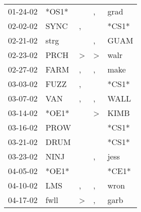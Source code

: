 \begin{supertabular}{p{0.07\textwidth}p{0.06\textwidth}p{0.02\textwidth}p{0.02\textwidth}p{0.06\textwidth}}
          01-24-02\textsuperscript{} &                            *OS1* &                  &                , &           grad\textsuperscript{} \\
          02-02-02\textsuperscript{} &           SYNC\textsuperscript{} &                , &                  &                            *CS1* \\
          02-21-02\textsuperscript{} &           strg\textsuperscript{} &                  &                , &           GUAM\textsuperscript{} \\
          02-23-02\textsuperscript{} &           PRCH\textsuperscript{} &     \textgreater &     \textgreater &           walr\textsuperscript{} \\
          02-27-02\textsuperscript{} &           FARM\textsuperscript{} &                , &                , &           make\textsuperscript{} \\
          03-03-02\textsuperscript{} &           FUZZ\textsuperscript{} &                , &                  &                            *CS1* \\
          03-07-02\textsuperscript{} &            VAN\textsuperscript{} &                , &                , &           WALL\textsuperscript{} \\
          03-14-02\textsuperscript{} &                            *OE1* &                  &     \textgreater &           KIMB\textsuperscript{} \\
          03-16-02\textsuperscript{} &           PROW\textsuperscript{} &                  &                  &                            *CS1* \\
          03-21-02\textsuperscript{} &           DRUM\textsuperscript{} &                  &                  &                            *CS1* \\
          03-23-02\textsuperscript{} &           NINJ\textsuperscript{} &                  &                , &           jess\textsuperscript{} \\
          04-05-02\textsuperscript{} &                            *OE1* &                  &                  &                            *CE1* \\
          04-10-02\textsuperscript{} &            LMS\textsuperscript{} &                , &                , &           wron\textsuperscript{} \\
          04-17-02\textsuperscript{} &           fwll\textsuperscript{} &     \textgreater &                , &           garb\textsuperscript{} \\

\end{supertabular}
